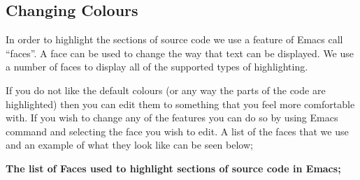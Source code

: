 \documentclass{article}
\begin{document}


\newpage


\subsection{Changing Colours}

In order to highlight the sections of source code we use a feature of
Emacs call ``faces''. A face can be used to change the way that text
can be displayed. We use a number of faces to display all of the
supported types of highlighting.

If you do not like the default colours (or any way the parts of the
code are highlighted) then you can edit them to something that you
feel more comfortable with. If you wish to change any of the features
you can do so by using Emacs  command and
selecting the face you wish to edit. A list of the faces that we use
and an example of what they look like can be seen below;

\medskip

\textbf{The list of Faces used to highlight sections of source code in
  Emacs;}
\end{document}
